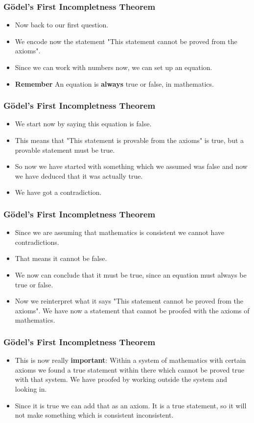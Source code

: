 \documentclass[aspectratio=169]{beamer}
\begin{document}
\begin{frame}
	\frametitle{Gödel's First Incompletness Theorem}
	\begin{itemize}
		\item Now back to our first question.
		\item We encode now the statement "This statement cannot be proved from the axioms".
		\item Since we can work with numbers now, we can set up an equation.
		\item \textbf{Remember} An equation is \textbf{always} true or false, in mathematics.
	\end{itemize}
\end{frame}

\begin{frame}
	\frametitle{Gödel's First Incompletness Theorem}
	\begin{itemize}
		\item We start now by saying this equation is false. 
		\item This means that "This statement is provable from the axioms" is true, but a provable statement must be true.
		\item So now we have started with something which we assumed was false and now we have deduced that it was actually true. 
		\item We have got a contradiction.
	\end{itemize}
\end{frame}

\begin{frame}
	\frametitle{Gödel's First Incompletness Theorem}
	\begin{itemize}
		\item Since we are assuming that mathematics is consistent we cannot have contradictions.
		\item That means it cannot be false. 
		\item We now can conclude that it must be true, since an equation must always be true or false.
		\item Now we reinterpret what it says "This statement cannot be proved from the axioms". We have now a statement that cannot be proofed with the axioms of mathematics.
	\end{itemize}
\end{frame}

\begin{frame}
	\frametitle{Gödel's First Incompletness Theorem}
	\begin{itemize}
		\item This is now really \textbf{important}: Within a system of mathematics with certain axioms we found a true statement within there which cannot be proved true with that system. We have proofed by working outside the system and looking in. \label{important}
		\item Since it is true we can add that as an axiom. It is a true statement, so it will not make something which is consistent inconsistent.
	\end{itemize}
\end{frame}
\end{document}
